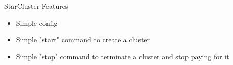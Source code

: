 \begin{frame}{StarCluster Features}
  \begin{itemize}
    \item Simple config
    \item Simple "start" command to create a cluster
    \item Simple "stop" command to terminate a cluster and stop paying for it
  \end{itemize}
\end{frame}
